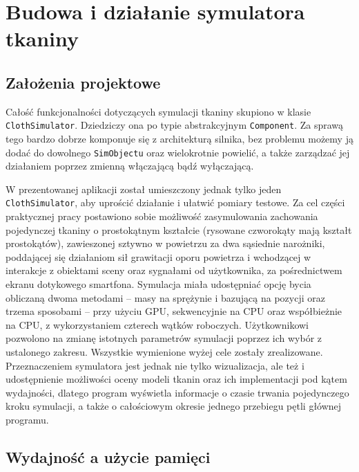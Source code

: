 \chapter{Budowa i działanie symulatora tkaniny}
\label{t:symulacja}

	\section{Założenia projektowe}
	\label{t:symulacja:zalozenia}
	
	
	Całość funkcjonalności dotyczących symulacji tkaniny skupiono w klasie \texttt{ClothSimulator}. Dziedziczy ona po typie abstrakcyjnym \texttt{Component}. Za sprawą tego bardzo dobrze komponuje się z architekturą silnika, bez problemu możemy ją dodać do dowolnego \texttt{SimObjectu} oraz wielokrotnie powielić, a także zarządzać jej działaniem poprzez zmienną włączającą bądź wyłączającą.
	
	W prezentowanej aplikacji został umieszczony jednak tylko jeden \texttt{ClothSimulator}, aby uprościć działanie i ułatwić pomiary testowe. Za cel części praktycznej pracy postawiono sobie możliwość zasymulowania zachowania pojedynczej tkaniny o prostokątnym kształcie (rysowane czworokąty mają kształt prostokątów), zawieszonej sztywno w powietrzu za dwa sąsiednie narożniki, poddającej się działaniom sił grawitacji oporu powietrza i wchodzącej w interakcje z obiektami sceny oraz sygnałami od użytkownika, za pośrednictwem ekranu dotykowego smartfona. Symulacja miała udostępniać opcję bycia obliczaną dwoma metodami -- masy na sprężynie i bazującą na pozycji oraz trzema sposobami -- przy użyciu GPU, sekwencyjnie na CPU oraz współbieżnie na CPU, z wykorzystaniem czterech wątków roboczych. Użytkownikowi pozwolono na zmianę istotnych parametrów symulacji poprzez ich wybór z ustalonego zakresu. Wszystkie wymienione wyżej cele zostały zrealizowane. Przeznaczeniem symulatora jest jednak nie tylko wizualizacja, ale też i udostępnienie możliwości oceny modeli tkanin oraz ich implementacji pod kątem wydajności, dlatego program wyświetla informacje o czasie trwania pojedynczego kroku symulacji, a także o całościowym okresie jednego przebiegu pętli głównej programu. 
	
	\section{Wydajność a użycie pamięci}
	\label{t:symulacja:wydajnoscpamiec}
	
